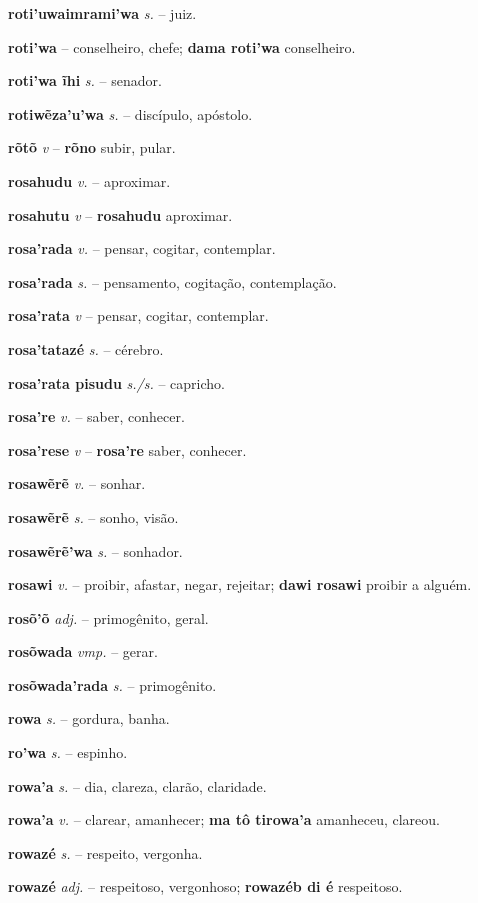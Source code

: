 \textbf{roti'uwaimrami'wa} \textit{s.} -- juiz.

\textbf{roti'wa} -- conselheiro, chefe; \textbf{dama roti'wa} conselheiro.

\textbf{roti'wa ĩhi} \textit{s.} -- senador.

\textbf{rotiwẽza'u'wa} \textit{s.} -- discípulo, apóstolo.

\textbf{rõtõ} \textit{v} -- \textbf{rõno} subir, pular.

\textbf{rosahudu} \textit{v.} -- aproximar.

\textbf{rosahutu} \textit{v} -- \textbf{rosahudu} aproximar.

\textbf{rosa'rada} \textit{v.} -- pensar, cogitar, contemplar.

\textbf{rosa'rada} \textit{s.} -- pensamento, cogitação, contemplação.

\textbf{rosa'rata} \textit{v} -- pensar, cogitar, contemplar.

\textbf{rosa'tatazé} \textit{s.} -- cérebro.

\textbf{rosa'rata pisudu} \textit{s./s.} -- capricho.

\textbf{rosa're} \textit{v.} -- saber, conhecer.

\textbf{rosa'rese} \textit{v} -- \textbf{rosa're} saber, conhecer.

\textbf{rosawẽrẽ} \textit{v.} -- sonhar.

\textbf{rosawẽrẽ} \textit{s.} -- sonho, visão.

\textbf{rosawẽrẽ'wa} \textit{s.} -- sonhador.

\textbf{rosawi} \textit{v.} -- proibir, afastar, negar, rejeitar; \textbf{dawi rosawi} proibir a alguém.

\textbf{rosõ'õ} \textit{adj.} -- primogênito, geral.

\textbf{rosõwada} \textit{vmp.} -- gerar.

\textbf{rosõwada'rada} \textit{s.} -- primogênito.

\textbf{rowa} \textit{s.} -- gordura, banha.

\textbf{ro'wa} \textit{s.} -- espinho.

\textbf{rowa'a} \textit{s.} -- dia, clareza, clarão, claridade.

\textbf{rowa'a} \textit{v.} -- clarear, amanhecer; \textbf{ma tô tirowa'a} amanheceu, clareou.

\textbf{rowazé} \textit{s.} -- respeito, vergonha.

\textbf{rowazé} \textit{adj.} -- respeitoso, vergonhoso; \textbf{rowazéb di é} respeitoso.


